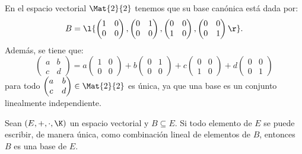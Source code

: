 \documentclass[compacto,10pt]{pubciencias-notas}
\begin{document}
\begin{ejem}\hspace{0pt}
En el espacio vectorial $\Mat{2}{2}$ tenemos que su base canónica está dada por:
\[
    B = \l\{\begin{pmatrix}1&0\\0&0\end{pmatrix}, 
            \begin{pmatrix}0&1\\0&0\end{pmatrix},
            \begin{pmatrix}0&0\\1&0\end{pmatrix},
            \begin{pmatrix}0&0\\0&1\end{pmatrix}\r\}.
\]
Además, se tiene que:
\[
    \begin{pmatrix}a&b\\c&d\end{pmatrix} = 
    a\begin{pmatrix}1&0\\0&0\end{pmatrix} +
    b\begin{pmatrix}0&1\\0&0\end{pmatrix} +
    c\begin{pmatrix}0&0\\1&0\end{pmatrix} +
    d\begin{pmatrix}0&0\\0&1\end{pmatrix}
\]
para todo $\begin{pmatrix}a&b\\c&d\end{pmatrix}\in\Mat{2}{2}$ es única, ya que una base es un conjunto linealmente independiente.
\end{ejem}

\begin{teo}
    Sean $(E,+,\cdot,\K)$ un espacio vectorial y $B\subseteq E$. Si todo elemento de $E$ se puede escribir, de manera única, como combinación lineal de elementos de $B$, entonces $B$ es una base de $E$.
\end{teo}
\end{document}
